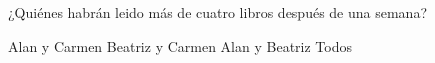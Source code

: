 ¿Quiénes habr\'an leido m\'as de cuatro libros despu\'es de una semana?

\begin{choices}\footnotesize
    \choice Alan y Carmen
    \choice Beatriz y Carmen
    \CorrectChoice Alan y Beatriz
    \choice Todos
\end{choices}
